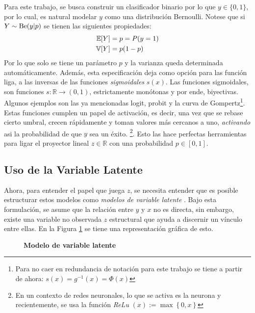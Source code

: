 \documentclass[../Main/Main.tex]{subfiles}
\begin{document}
Para este trabajo, se busca construir un clasificador binario por lo que $y \in \{0,1\}$, por lo cual, es natural modelar $y$ como una distribución Bernoulli. Notese que si $Y \sim \text{Be}(y|p)$ se tienen las siguientes propiedades: 
\begin{align*}
	\mathbb{E}[Y] &= p = P(y = 1) \\
	\mathbb{V}[Y] &= p(1-p)
\end{align*}
Por lo que solo se tiene un parámetro $p$ y la varianza queda determinada automáticamente. Además, esta especificación deja como  opción para las función liga, a las inversas de las funciones \textit{sigmoidales} $s(x)$. Las funciones sigmoidales, son funciones $s:\mathbb{R}\rightarrow (0,1)$, estrictamente monótonas y por ende, biyectivas. Algunos ejemplos son las ya mencionadas logit, probit y la curva de Gompertz\footnote{Para no caer en redundancia de notación para este trabajo se tiene a partir de ahora: $s(x) = g^{-1}(x) = \Phi(x)$}. Estas funciones cumplen un papel de activación, es decir, una vez que se rebase cierto umbral, crecen rápidamente y toman valores más cercanos a uno, \textit{activando} asi la probabilidad de que $y$ sea un éxito. \footnote{En un contexto de redes neuronales, lo que se activa es la neurona y recientemente, se usa la función \textit{ReLu} $(x):= \max\left\{0,x\right\}$}. Esto las hace perfectas herramientas para ligar el proyector lineal $z\in\mathbb{R}$ con una probabilidad $p\in[0,1]$.\\

\subsection{Uso de la Variable Latente}

Ahora, para entender el papel que juega $z$, se necesita entender que es posible estructurar estos modelos como \textit{modelos de variable latente} \autocite{albert1993bayesian}. Bajo esta formulación, se asume que la relación entre $y$ y $x$ no es directa, sin embargo, existe una variable no observada $z$ estructural que ayuda a discernir un vínculo entre ellas. En la Figura \ref{fig:DiagramaVar} se tiene una representación gráfica de esto. \\

\begin{figure}[h]
\centering
{}
\caption{\textbf{Modelo de variable latente}}
\label{fig:DiagramaVar}
\end{figure}
\end{document}
